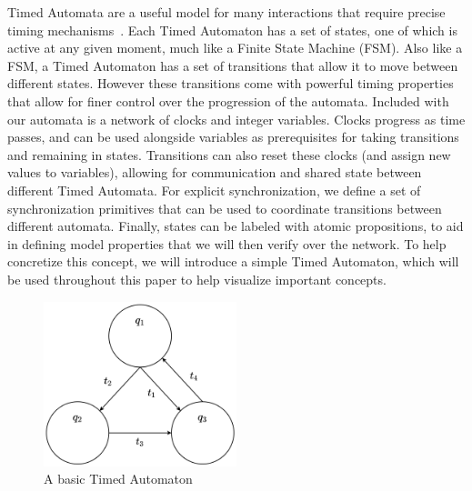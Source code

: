 \documentclass[a4paper,11pt]{report}
\theoremstyle{definition}
\begin{document}
Timed Automata are a useful model for many interactions that require precise
timing mechanisms~\cite{alur94}. Each Timed Automaton has a set of states, one
of which is active at any given moment, much like a Finite State Machine (FSM).
Also like a FSM, a Timed Automaton has a set of transitions that allow it to
move between different states. However these transitions come with powerful
timing properties that allow for finer control over the progression of the
automata. Included with our automata is a network of clocks and integer
variables. Clocks progress as time passes, and can be used alongside variables
as prerequisites for taking transitions and remaining in states. Transitions can
also reset these clocks (and assign new values to variables), allowing for
communication and shared state between different Timed Automata. For explicit
synchronization, we define a set of synchronization primitives that can be used
to coordinate transitions between different automata. Finally, states can be
labeled with atomic propositions, to aid in defining model properties that we
will then verify over the network. To help concretize this concept, we will
introduce a simple Timed Automaton, which will be used throughout this paper to
help visualize important concepts.

%    
\begin{figure}[h]
  \centering
  \includegraphics[width=0.5\textwidth]{minTA-blank}
  \caption{A basic Timed Automaton}
  \label{fig:example-blank}
\end{figure}
\end{document}
